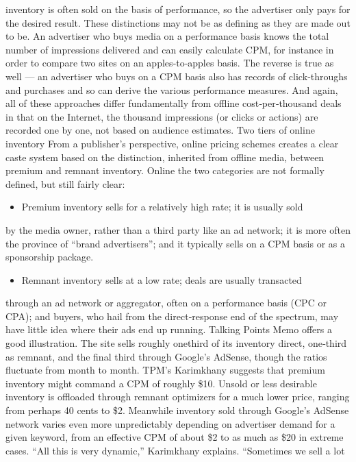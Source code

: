 inventory is often sold on the basis of performance, so the advertiser only
pays for the desired result.
These distinctions may not be as defining as they are made out to be. An
advertiser who buys media on a performance basis knows the total
number of impressions delivered and can easily calculate CPM, for
instance in order to compare two sites on an apples‐to‐apples basis. The
reverse is true as well — an advertiser who buys on a CPM basis also has
records of click‐throughs and purchases and so can derive the various
performance measures. And again, all of these approaches differ
fundamentally from offline cost‐per‐thousand deals in that on the
Internet, the thousand impressions (or clicks or actions) are recorded one
by one, not based on audience estimates.
Two tiers of online inventory
From a publisher’s perspective, online pricing schemes creates a clear
caste system based on the distinction, inherited from offline media,
between premium and remnant inventory. Online the two categories are
not formally defined, but still fairly clear:
\begin{itemize}
\item Premium inventory sells for a relatively high rate; it is usually sold
\end{itemize}
by the media owner, rather than a third party like an ad network; it
is more often the province of ``brand advertisers''; and it typically
sells on a CPM basis or as a sponsorship package.
\begin{itemize}
\item Remnant inventory sells at a low rate; deals are usually transacted
\end{itemize}
through an ad network or aggregator, often on a performance basis
(CPC or CPA); and buyers, who hail from the direct‐response end
of the spectrum, may have little idea where their ads end up
running.
Talking Points Memo offers a good illustration. The site sells roughly onethird
of its inventory direct, one‐third as remnant, and the final third
through Google’s AdSense, though the ratios fluctuate from month to
month. TPM’s Karimkhany suggests that premium inventory might
command a CPM of roughly \$10. Unsold or less desirable inventory is
offloaded through remnant optimizers for a much lower price, ranging
from perhaps 40 cents to \$2. Meanwhile inventory sold through Google’s
AdSense network varies even more unpredictably depending on
advertiser demand for a given keyword, from an effective CPM of about
\$2 to as much as \$20 in extreme cases.
``All this is very dynamic,'' Karimkhany explains. ``Sometimes we sell a lot
